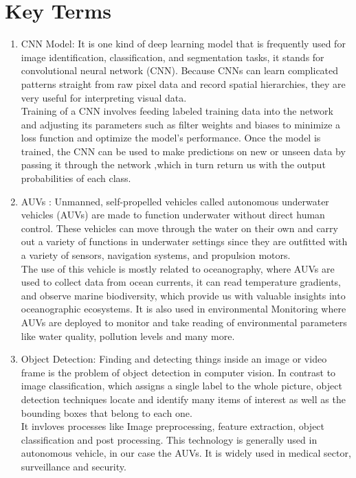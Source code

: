 \documentclass[lettersize,journal]{IEEEtran}
\begin{document}
{\appendices
\section{Key Terms}
\begin{enumerate}
    \item CNN Model: It is one kind of deep learning model that is frequently used for image identification, classification, and segmentation tasks, it stands for convolutional neural network (CNN). Because CNNs can learn complicated patterns straight from raw pixel data and record spatial hierarchies, they are very useful for interpreting visual data. \\
    Training of a CNN involves feeding labeled training data into the network and adjusting its parameters such as filter weights and biases to minimize a loss function and optimize the model's performance. Once the model is trained, the CNN can be used to make predictions on new or unseen data by passing it through the network ,which in turn return us with the output probabilities of each class.\\
    \item AUVs : Unmanned, self-propelled vehicles called autonomous underwater vehicles (AUVs) are made to function underwater without direct human control. These vehicles can move through the water on their own and carry out a variety of functions in underwater settings since they are outfitted with a variety of sensors, navigation systems, and propulsion motors. \\
    The use of this vehicle is mostly related to oceanography, where AUVs are used to collect data from ocean currents, it can read temperature gradients, and observe marine biodiversity, which provide us with valuable insights into oceanographic ecosystems. It is also used in environmental Monitoring where AUVs are deployed to monitor and take reading of environmental parameters like water quality, pollution levels and many more.\\
    \item Object Detection: Finding and detecting things inside an image or video frame is the problem of object detection in computer vision. In contrast to image classification, which assigns a single label to the whole picture, object detection techniques locate and identify many items of interest as well as the bounding boxes that belong to each one. \\
    It invloves processes like Image preprocessing, feature extraction, object classification and post processing. This technology is generally used in autonomous vehicle, in our case the AUVs. It is widely used in medical sector, surveillance and security.\\

\end{enumerate}}
\end{document}

